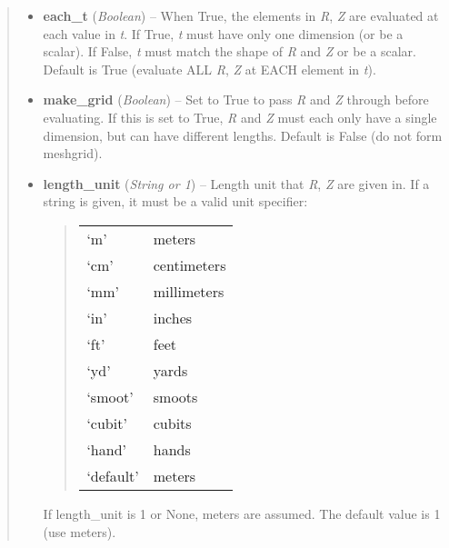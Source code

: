 \documentclass[letterpaper,10pt,english]{sphinxmanual}
\begin{document}
\begin{fulllineitems}
\begin{fulllineitems}
\begin{quote}
\begin{description}
\begin{itemize}
\item {} 
\textbf{each\_t} (\emph{Boolean}) --
When True, the elements in \emph{R}, \emph{Z} are evaluated
at each value in \emph{t}. If True, \emph{t} must have only one dimension
(or be a scalar). If False, \emph{t} must match the shape of \emph{R} and
\emph{Z} or be a scalar. Default is True (evaluate ALL \emph{R}, \emph{Z} at
EACH element in \emph{t}).

\item {} 
\textbf{make\_grid} (\emph{Boolean}) --
Set to True to pass \emph{R} and \emph{Z} through
 before evaluating. If this is set to
True, \emph{R} and \emph{Z} must each only have a single dimension, but
can have different lengths. Default is False (do not form
meshgrid).

\item {} 
\textbf{length\_unit} (\emph{String or 1}) --
Length unit that \emph{R}, \emph{Z} are given in.
If a string is given, it must be a valid unit specifier:
\begin{quote}

\begin{tabulary}{\linewidth}{|L|L|}
\hline

`m'
 & 
meters
\\

`cm'
 & 
centimeters
\\

`mm'
 & 
millimeters
\\

`in'
 & 
inches
\\

`ft'
 & 
feet
\\

`yd'
 & 
yards
\\

`smoot'
 & 
smoots
\\

`cubit'
 & 
cubits
\\

`hand'
 & 
hands
\\

`default'
 & 
meters
\\
\hline\end{tabulary}

\end{quote}

If length\_unit is 1 or None, meters are assumed. The default
value is 1 (use meters).


\end{itemize}
\end{description}
\end{quote}
\end{fulllineitems}
\end{fulllineitems}
\end{document}
